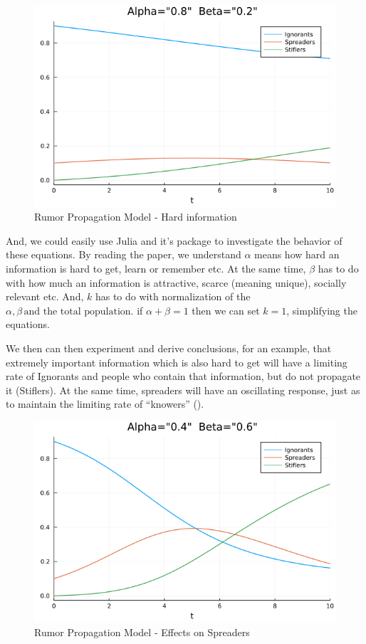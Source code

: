 \documentclass[
12pt,				%
openright,			%
oneside,			%
a4paper,			%
brazil,				%
english,			  %
]{abntex2}
\begin{document}
\begin{figure}[ht]
  \centering
    \caption{\label{fig:diffeq-case1} Rumor Propagation Model - Hard information}
    \includegraphics[width=0.5\linewidth]{Imagens/fig09.png}
\end{figure}

And, we could easily use Julia and it's package to investigate the behavior of these equations. By reading the paper, we understand $\alpha$ means how hard an information is hard to get, learn or remember etc. At the same time, $\beta$ has to do with how much an information is attractive, scarce (meaning unique), socially relevant etc. And, $k$ has to do with normalization of the $\alpha, \beta{} \, \textrm{and the total population}$. if $\alpha + \beta = 1$ then we can set $k=1$, simplifying the equations.%


We then can then experiment and derive conclusions, for an example, that extremely important information which is also hard to get will have a limiting rate of Ignorants and people who contain that information, but do not propagate it (Stiflers). At the same time, spreaders will have an oscillating response, just as to maintain the limiting rate of ``knowers'' ().

\begin{figure}[!htb]
  \centering
    \caption{\label{fig:diffeq-case2} Rumor Propagation Model - Effects on Spreaders}
    \includegraphics[width=0.5\linewidth]{Imagens/fig95.png}
\end{figure}
\end{document}
